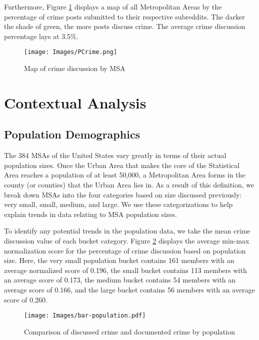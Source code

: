 \documentclass[12pt,oneside, letterpaper]{book}
\begin{document}
\par Furthermore, Figure \ref{fig:map-1} displays a map of all Metropolitan Areas by the percentage of crime posts submitted to their respective subreddits. The darker the shade of green, the more posts discuss crime. The average crime discussion percentage lays at 3.5\%.

\begin{figure}[ht]
    \texttt{[image: Images/PCrime.png]}
    \caption{Map of crime discussion by MSA}
    \label{fig:map-1}
\end{figure}

\section{Contextual Analysis}

\subsection{Population Demographics}

\par The 384 MSAs of the United States vary greatly in terms of their actual population sizes. Once the Urban Area that makes the core of the Statistical Area reaches a population of at least 50,000, a Metropolitan Area forms in the county (or counties) that the Urban Area lies in. As a result of this definition, we break down MSAs into the four categories based on size discussed previously: very small, small, medium, and large. We use these categorizations to help explain trends in data relating to MSA population sizes.

\par To identify any potential trends in the population data, we take the mean crime discussion value of each bucket category. Figure \ref{fig:graph-1} displays the average min-max normalization score for the percentage of crime discussion based on population size. Here, the very small population bucket contains 161 members with an average normalized score of 0.196, the small bucket contains 113 members with an average score of 0.173, the medium bucket contains 54 members with an average score of 0.166, and the large bucket contains 56 members with an average score of 0.260.

\begin{figure}[ht]
    \centering
    \texttt{[image: Images/bar-population.pdf]}
    \caption{Comparison of discussed crime and documented crime by population}
    \label{fig:graph-1}
\end{figure}
\end{document}
